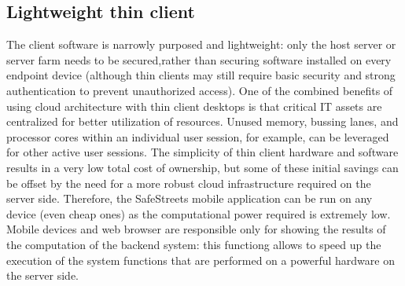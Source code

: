 \subsection{Lightweight thin client}
The client software is narrowly purposed and lightweight: only the host server or server farm needs to be secured,rather than securing software installed on every endpoint device (although thin clients may still require basic security and strong authentication to prevent unauthorized access). One of the combined benefits of using cloud architecture with thin client desktops is that critical IT assets are centralized for better utilization of resources. Unused memory, bussing lanes, and processor cores within an individual user session, for example, can be leveraged for other active user sessions.
\newline
The simplicity of thin client hardware and software results in a very low total cost of ownership, but some of these initial savings can be offset by the need for a more robust cloud infrastructure required on the server side. Therefore, the SafeStreets mobile application can be run on any device (even cheap ones) as the computational power required is extremely low.
\newline
Mobile devices and web browser are responsible only for showing the results of the computation of the backend system: this functiong allows to speed up the execution of the system functions that are performed on a powerful hardware on the server side.
